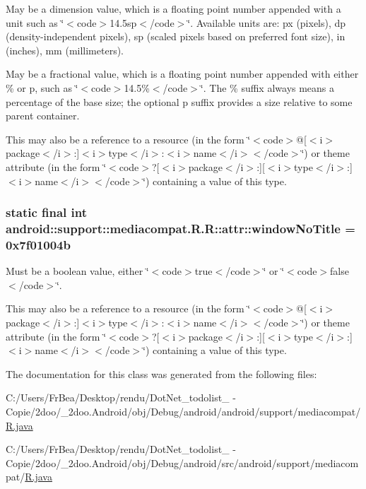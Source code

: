 May be a dimension value, which is a floating point number appended with a unit such as \char`\"{}$<$code$>$14.5sp$<$/code$>$\char`\"{}. Available units are: px (pixels), dp (density-independent pixels), sp (scaled pixels based on preferred font size), in (inches), mm (millimeters). 

May be a fractional value, which is a floating point number appended with either \% or p, such as \char`\"{}$<$code$>$14.5\%$<$/code$>$\char`\"{}. The \% suffix always means a percentage of the base size; the optional p suffix provides a size relative to some parent container. 

This may also be a reference to a resource (in the form \char`\"{}$<$code$>$@\mbox{[}$<$i$>$package$<$/i$>$:\mbox{]}$<$i$>$type$<$/i$>$:$<$i$>$name$<$/i$>$$<$/code$>$\char`\"{}) or theme attribute (in the form \char`\"{}$<$code$>$?\mbox{[}$<$i$>$package$<$/i$>$:\mbox{]}\mbox{[}$<$i$>$type$<$/i$>$:\mbox{]}$<$i$>$name$<$/i$>$$<$/code$>$\char`\"{}) containing a value of this type. \hypertarget{classandroid_1_1support_1_1mediacompat_1_1_r_1_1attr_fbc8d8d7d03d7d2c5f70b2be310df609}{
\subsubsection[{windowNoTitle}]{\setlength{\rightskip}{0pt plus 5cm}static final int android::support::mediacompat.R.R::attr::windowNoTitle = 0x7f01004b}}
\label{classandroid_1_1support_1_1mediacompat_1_1_r_1_1attr_fbc8d8d7d03d7d2c5f70b2be310df609}


Must be a boolean value, either \char`\"{}$<$code$>$true$<$/code$>$\char`\"{} or \char`\"{}$<$code$>$false$<$/code$>$\char`\"{}. 

This may also be a reference to a resource (in the form \char`\"{}$<$code$>$@\mbox{[}$<$i$>$package$<$/i$>$:\mbox{]}$<$i$>$type$<$/i$>$:$<$i$>$name$<$/i$>$$<$/code$>$\char`\"{}) or theme attribute (in the form \char`\"{}$<$code$>$?\mbox{[}$<$i$>$package$<$/i$>$:\mbox{]}\mbox{[}$<$i$>$type$<$/i$>$:\mbox{]}$<$i$>$name$<$/i$>$$<$/code$>$\char`\"{}) containing a value of this type. 

The documentation for this class was generated from the following files:\begin{CompactItemize}
\item 
C:/Users/FrBea/Desktop/rendu/DotNet\_\-todolist\_ - Copie/2doo/\_\-2doo.Android/obj/Debug/android/android/support/mediacompat/\hyperlink{android_2support_2mediacompat_2_r_8java}{R.java}\item 
C:/Users/FrBea/Desktop/rendu/DotNet\_\-todolist\_ - Copie/2doo/\_\-2doo.Android/obj/Debug/android/src/android/support/mediacompat/\hyperlink{src_2android_2support_2mediacompat_2_r_8java}{R.java}\end{CompactItemize}
